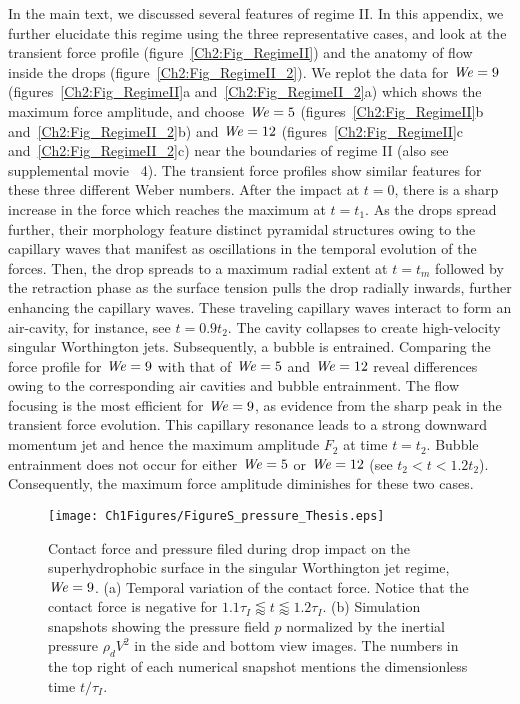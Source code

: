 \begin{subappendices}
	In the main text, we discussed several features of regime II. In this appendix, we further elucidate this regime using the three representative cases, and look at the transient force profile (figure~\ref{Ch2:Fig_RegimeII}) and the anatomy of flow inside the drops (figure~\ref{Ch2:Fig_RegimeII_2}). We replot the data for $\mathit{We} = 9$ (figures~\ref{Ch2:Fig_RegimeII}a and~\ref{Ch2:Fig_RegimeII_2}a) which shows the maximum force amplitude, and choose $\mathit{We} = 5$ (figures~\ref{Ch2:Fig_RegimeII}b and~\ref{Ch2:Fig_RegimeII_2}b) and $\mathit{We} = 12$ (figures~\ref{Ch2:Fig_RegimeII}c and~\ref{Ch2:Fig_RegimeII_2}c) near the boundaries of regime II (also see supplemental movie~{\color{Myfig} 4}). The transient force profiles show similar features for these three different Weber numbers. After the impact at $t = 0$, there is a sharp increase in the force which reaches the maximum at $t = t_1$. As the drops spread further, their morphology feature distinct pyramidal structures owing to the capillary waves \cite{renardy2003pyramidal} that manifest as oscillations in the temporal evolution of the forces. Then, the drop spreads to a maximum radial extent at $t = t_m$ followed by the retraction phase as the surface tension pulls the drop radially inwards, further enhancing the capillary waves. These traveling capillary waves interact to form an air-cavity, for instance, see $t = 0.9t_2$. The cavity collapses to create high-velocity singular Worthington jets. Subsequently, a bubble is entrained. Comparing the force profile for $\mathit{We} = 9$ with that of $\mathit{We} = 5$ and $\mathit{We} = 12$ reveal differences owing to the corresponding air cavities and bubble entrainment. The flow focusing is the most efficient for $\mathit{We} = 9$, as evidence from the sharp peak in the transient force evolution. This capillary resonance leads to a strong downward momentum jet and hence the maximum amplitude $F_2$ at time $t = t_2$. Bubble entrainment does not occur for either $\mathit{We} = 5$ or $\mathit{We} = 12$ (see $t_2 < t < 1.2t_2$). Consequently, the maximum force amplitude diminishes for these two cases. 
	
	\begin{figure}
		\centering
		\texttt{[image: Ch1Figures/FigureS\_pressure\_Thesis.eps]}
		\caption{Contact force and pressure filed during drop impact on the superhydrophobic surface in the singular Worthington jet regime, $\mathit{We} = 9$. (a) Temporal variation of the contact force. Notice that the contact force is negative for $1.1\tau_I \lessapprox t \lessapprox 1.2\tau_I$. (b) Simulation snapshots showing the pressure field $p$ normalized by the inertial pressure $\rho_dV^2$ in the side and bottom view images. The numbers in the top right of each numerical snapshot mentions the dimensionless time $t/\tau_I$.}
		\label{Fig_Pressure}
	\end{figure}
	

\end{subappendices}
